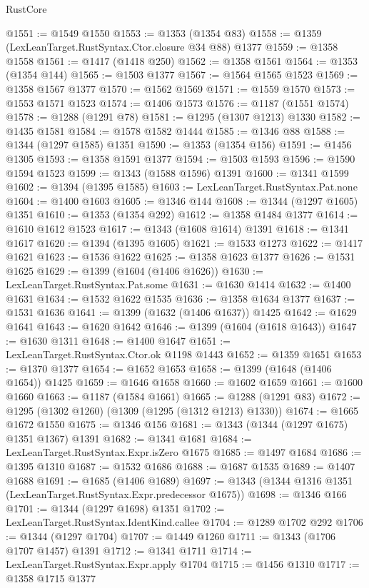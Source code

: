 \begin{lexlean}{RustCore}
\begin{coremodule}
@1551 := @1549 @1550
@1553 := @1353 (@1354 @83)
@1558 := @1359 (LexLeanTarget.RustSyntax.Ctor.closure @34 @88) @1377
@1559 := @1358 @1558
@1561 := @1417 (@1418 @250)
@1562 := @1358 @1561
@1564 := @1353 (@1354 @144)
@1565 := @1503 @1377
@1567 := @1564 @1565 @1523
@1569 := @1358 @1567 @1377
@1570 := @1562 @1569
@1571 := @1559 @1570
@1573 := @1553 @1571 @1523
@1574 := @1406 @1573
@1576 := @1187 (@1551 @1574)
@1578 := @1288 (@1291 @78)
@1581 := @1295 (@1307 @1213) @1330
@1582 := @1435 @1581
@1584 := @1578 @1582 @1444
@1585 := @1346 @88
@1588 := @1344 (@1297 @1585) @1351
@1590 := @1353 (@1354 @156)
@1591 := @1456 @1305
@1593 := @1358 @1591 @1377
@1594 := @1503 @1593
@1596 := @1590 @1594 @1523
@1599 := @1343 (@1588 @1596) @1391
@1600 := @1341 @1599
@1602 := @1394 (@1395 @1585)
@1603 := LexLeanTarget.RustSyntax.Pat.none
@1604 := @1400 @1603
@1605 := @1346 @144
@1608 := @1344 (@1297 @1605) @1351
@1610 := @1353 (@1354 @292)
@1612 := @1358 @1484 @1377
@1614 := @1610 @1612 @1523
@1617 := @1343 (@1608 @1614) @1391
@1618 := @1341 @1617
@1620 := @1394 (@1395 @1605)
@1621 := @1533 @1273
@1622 := @1417 @1621
@1623 := @1536 @1622
@1625 := @1358 @1623 @1377
@1626 := @1531 @1625
@1629 := @1399 (@1604 (@1406 @1626))
@1630 := LexLeanTarget.RustSyntax.Pat.some
@1631 := @1630 @1414
@1632 := @1400 @1631
@1634 := @1532 @1622 @1535
@1636 := @1358 @1634 @1377
@1637 := @1531 @1636
@1641 := @1399 (@1632 (@1406 @1637)) @1425
@1642 := @1629 @1641
@1643 := @1620 @1642
@1646 := @1399 (@1604 (@1618 @1643))
@1647 := @1630 @1311
@1648 := @1400 @1647
@1651 := LexLeanTarget.RustSyntax.Ctor.ok @1198 @1443
@1652 := @1359 @1651
@1653 := @1370 @1377
@1654 := @1652 @1653
@1658 := @1399 (@1648 (@1406 @1654)) @1425
@1659 := @1646 @1658
@1660 := @1602 @1659
@1661 := @1600 @1660
@1663 := @1187 (@1584 @1661)
@1665 := @1288 (@1291 @83)
@1672 := @1295 (@1302 @1260) (@1309 (@1295 (@1312 @1213) @1330))
@1674 := @1665 @1672 @1550
@1675 := @1346 @156
@1681 := @1343 (@1344 (@1297 @1675) @1351 @1367) @1391
@1682 := @1341 @1681
@1684 := LexLeanTarget.RustSyntax.Expr.isZero @1675
@1685 := @1497 @1684
@1686 := @1395 @1310
@1687 := @1532 @1686
@1688 := @1687 @1535
@1689 := @1407 @1688
@1691 := @1685 (@1406 @1689)
@1697 := @1343 (@1344 @1316 @1351 (LexLeanTarget.RustSyntax.Expr.predecessor @1675))
@1698 := @1346 @166
@1701 := @1344 (@1297 @1698) @1351
@1702 := LexLeanTarget.RustSyntax.IdentKind.callee
@1704 := @1289 @1702 @292
@1706 := @1344 (@1297 @1704)
@1707 := @1449 @1260
@1711 := @1343 (@1706 @1707 @1457) @1391
@1712 := @1341 @1711
@1714 := LexLeanTarget.RustSyntax.Expr.apply @1704
@1715 := @1456 @1310
@1717 := @1358 @1715 @1377

\end{coremodule}
\end{lexlean}
